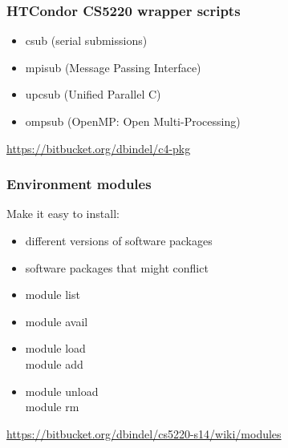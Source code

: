 \documentclass{beamer}
\begin{document}
\begin{frame}
  \frametitle{HTCondor CS5220 wrapper scripts}

  \begin{itemize}
  \item csub (serial submissions)
  \vspace{5mm}
  \item mpisub (Message Passing Interface)
  \vspace{5mm}
  \item upcsub (Unified Parallel C)
  \vspace{5mm}
  \item ompsub (OpenMP: Open Multi-Processing)
  \end{itemize}
  \vspace{10mm}
  \small \url{https://bitbucket.org/dbindel/c4-pkg}
\end{frame}

\begin{frame}
  \frametitle{Environment modules}
  
  Make it easy to install:\\
  \begin{itemize}
  \item different versions of software packages\\
  \item software packages that might conflict\\
  \end{itemize}
  \vspace{5mm}
  \begin{itemize}
  \item module list
  \vspace{5mm}
  \item module avail
  \vspace{5mm}
  \item module load \\
  module add
  \vspace{5mm}
  \item module unload \\
  module rm
  \end{itemize}
  \small \url{https://bitbucket.org/dbindel/cs5220-s14/wiki/modules}
\end{frame}
\end{document}
